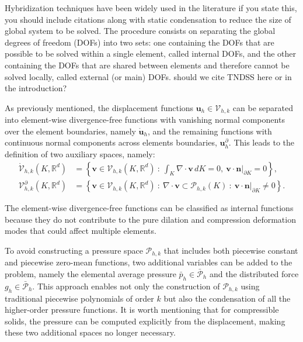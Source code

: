 \documentclass[english,11pt,3p,number,sort&compress]{elsarticle}
\newcommand{\nathan}{\color{red}{\bf\Large NS} \color{cyan} }
\begin{document}
Hybridization techniques have been widely used in the literature {\nathan if you state this, you should include citations} along with static condensation to reduce the size of global system to be solved. The procedure consists on separating the global degrees of freedom (DOFs) into two sets: one containing the DOFs that are possible to be solved within a single element, called internal DOFs, and the other containing the DOFs that are shared between elements and therefore cannot be solved locally, called external (or main) DOFs. {\nathan should we cite TNDSS here or in the introduction?}

As previously mentioned, the displacement functions $\bm{u}_h \in \mathcal{V}_{h,k}$ can be separated into element-wise divergence-free functions with vanishing normal components over the element boundaries, namely $\mathring{\bm{u}}_h$, and the remaining functions with continuous normal components across elements boundaries, $\bm{u}^\partial_h$. This leads to the definition of two auxiliary spaces, namely:
\begin{subequations} \label{eq:internal-external-functions}
	\begin{align}
		\mathring{\mathcal{V}}_{h,k}(K,\mathbb{R}^d) &= \left\{ \bm{v} \in \mathcal{V}_{h,k}(K,\mathbb{R}^d) ~:~ \int_K\nabla \cdot \bm{v}\,dK = 0, ~\bm{v}\cdot\bm{n}\lvert_{\partial K} = 0 \right\},\\
		\mathcal{V}^\partial_{h,k}(K,\mathbb{R}^d) &= \left\{ \bm{v} \in \mathcal{V}_{h,k}(K,\mathbb{R}^d) ~:~ \nabla \cdot \bm{v} \subset \mathcal{P}_{h,k}(K) ~:~ \bm{v}\cdot\bm{n}\lvert_{\partial K} \neq 0 \right\}.
	\end{align}
\end{subequations}

The element-wise divergence-free functions can be classified as internal functions because they do not contribute to the pure dilation and compression deformation modes that could affect multiple elements.

To avoid constructing a pressure space $\mathcal{P}_{h,k}$ that includes both piecewise constant and piecewise zero-mean functions, two additional variables can be added to the problem, namely the elemental average pressure $\bar{p}_h \in \bar{\mathcal{P}}_h$ and the distributed force $g_h \in \bar{\mathcal{P}}_{h}$. This approach enables not only the construction of $\mathcal{P}_{h,k}$ using traditional piecewise polynomials of order $k$ but also the condensation of all the higher-order pressure functions. It is worth mentioning that for compressible solids, the pressure can be computed explicitly from the displacement, making these two additional spaces no longer necessary.
\end{document}
